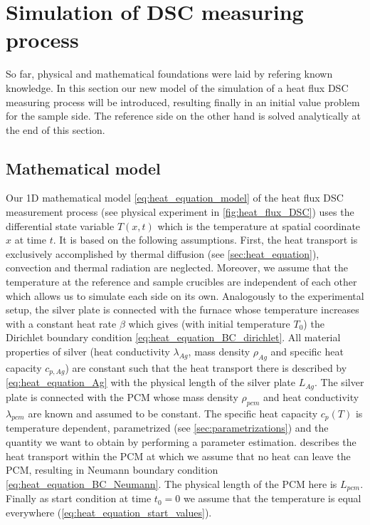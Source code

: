\documentclass{scrartcl}[12pt, halfparskip]
\numberwithin{equation}{section}
\numberwithin{figure}{section}
\numberwithin{table}{section}
\begin{document}
\newpage
\section{Simulation of DSC measuring process}
\label{sec:simulation_of_DSC}

So far, physical and mathematical foundations were laid by refering known knowledge. In this section our new model of the simulation of a heat flux DSC measuring process will be introduced, resulting finally in an initial value problem for the sample side. The reference side on the other hand is solved analytically at the end of this section.




\subsection{Mathematical model}
\label{sec:mathematical_model}

Our 1D mathematical model \cref{eq:heat_equation_model} of the heat flux DSC measurement process (see physical experiment in \cref{fig:heat_flux_DSC}) uses the differential state variable $T(x,t)$ which is the temperature at spatial coordinate $x$ at time $t$. It is based on the following assumptions. First, the heat transport is exclusively accomplished by thermal diffusion (see \cref{sec:heat_equation}), convection and thermal radiation are neglected. 
Moreover, we assume that the temperature at the reference and sample crucibles are independent of each other which allows us to simulate each side on its own. 
Analogously to the experimental setup, the silver plate is connected with the furnace whose temperature increases with a constant heat rate $\beta$ which gives (with initial temperature $T_0$) the Dirichlet boundary condition \cref{eq:heat_equation_BC_dirichlet}. All material properties of silver (heat conductivity $\lambda_{Ag}$, mass density $\rho_{Ag}$ and specific heat capacity $c_{p,Ag}$) are constant such that the heat transport there is described by \cref{eq:heat_equation_Ag} with the physical length of the silver plate $L_{Ag}$. The silver plate is connected with the PCM whose mass density $\rho_{pcm}$ and heat conductivity $\lambda_{pcm}$ are known and assumed to be constant. The specific heat capacity $c_p(T)$ is temperature dependent, parametrized (see \cref{sec:parametrizations}) and the quantity we want to obtain by performing a parameter estimation.  describes the heat transport within the PCM at which we assume that no heat can leave the PCM, resulting in Neumann boundary condition \cref{eq:heat_equation_BC_Neumann}. The physical length of the PCM here is $L_{pcm}$. Finally as start condition at time ${t_0 = 0}$ we assume that the temperature is equal everywhere (\cref{eq:heat_equation_start_values}). 
\end{document}
